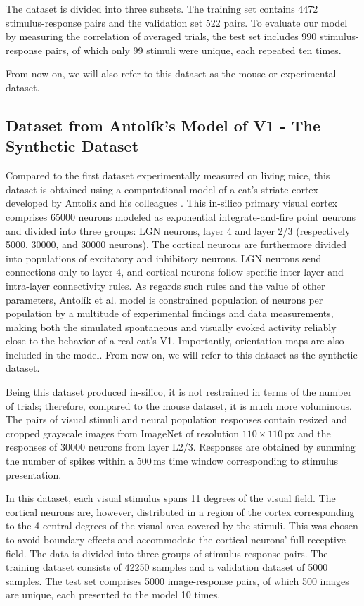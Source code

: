The dataset is divided into three subsets. The training set contains 4472 stimulus-response pairs and the validation set 522 pairs. To evaluate our model by measuring the correlation of averaged trials, the test set includes 990 stimulus-response pairs, of which only 99 stimuli were unique, each repeated ten times.

From now on, we will also refer to this dataset as the mouse or experimental dataset.


\subsection{Dataset from Antolík’s Model of V1 - The Synthetic Dataset}

Compared to the first dataset experimentally measured on living mice, this dataset is obtained using a computational model of a cat’s striate cortex developed by Antolík and his colleagues \citep{antolik2019comprehensive}. This in-silico primary visual cortex comprises 65000 neurons modeled as exponential integrate-and-fire point neurons \citep{brette2005adaptive} and divided into three groups: LGN neurons, layer 4 and layer 2/3 (respectively 5000, 30000, and 30000 neurons). The cortical neurons are furthermore divided into populations of excitatory and inhibitory neurons. LGN neurons send connections only to layer 4, and cortical neurons follow specific inter-layer and intra-layer connectivity rules. As regards such rules and the value of other parameters, Antolík et al. model is constrained population of neurons per population by a multitude of experimental findings and data measurements, making both the simulated spontaneous and visually evoked activity reliably close to the behavior of a real cat’s V1. Importantly, orientation maps are also included in the model. From now on, we will refer to this dataset as the synthetic dataset.

Being this dataset produced in-silico, it is not restrained in terms of the number of trials; therefore, compared to the mouse dataset, it is much more voluminous. The pairs of visual stimuli and neural population responses contain resized and cropped grayscale images from ImageNet \citep{deng2009imagenet} of resolution $110 \times 110$\,px and the responses of 30000 neurons from layer L2/3. Responses are obtained by summing the number of spikes within a 500\,ms time window corresponding to stimulus presentation. 

In this dataset, each visual stimulus spans 11 degrees of the visual field. The cortical neurons are, however, distributed in a region of the cortex corresponding to the 4 central degrees of the visual area covered by the stimuli. This was chosen to avoid boundary effects and accommodate the cortical neurons' full receptive field.
The data is divided into three groups of stimulus-response pairs. The training dataset consists of 42250 samples and a validation dataset of 5000 samples. The test set comprises 5000 image-response pairs, of which 500 images are unique, each presented to the model 10 times.

